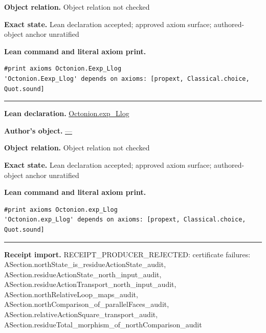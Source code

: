 \documentclass[11pt]{article}
\theoremstyle{plain}
\theoremstyle{definition}
\theoremstyle{remark}
\begin{document}
\begin{tcolorbox}
\par\textbf{Object relation.} Object relation not checked
\par\textbf{Exact state.} Lean declaration accepted; approved axiom surface; authored-object anchor unratified
\par\smallskip\textbf{Lean command and literal axiom print.}
\begin{Verbatim}[breaklines=true,breakanywhere=true,fontsize=\small]
#print axioms Octonion.Eexp_Llog
'Octonion.Eexp_Llog' depends on axioms: [propext, Classical.choice, Quot.sound]
\end{Verbatim}
\medskip\hrule\medskip
\textbf{Lean declaration.} \url{Octonion.exp_Llog}
\par\textbf{Author's object.} \url{—}
\par\textbf{Object relation.} Object relation not checked
\par\textbf{Exact state.} Lean declaration accepted; approved axiom surface; authored-object anchor unratified
\par\smallskip\textbf{Lean command and literal axiom print.}
\begin{Verbatim}[breaklines=true,breakanywhere=true,fontsize=\small]
#print axioms Octonion.exp_Llog
'Octonion.exp_Llog' depends on axioms: [propext, Classical.choice, Quot.sound]
\end{Verbatim}
\medskip\hrule\medskip
\textbf{Receipt import.} \textcolor{KgtRed}{RECEIPT\_PRODUCER\_REJECTED: certificate failures: ASection.northState\_is\_residueActionState\_audit, ASection.residueActionState\_north\_input\_audit, ASection.residueActionTransport\_north\_input\_audit, ASection.northRelativeLoop\_maps\_audit, ASection.northComparison\_of\_parallelFaces\_audit, ASection.relativeActionSquare\_transport\_audit, ASection.residueTotal\_morphism\_of\_northComparison\_audit}
\end{tcolorbox}
\medskip
\end{document}
